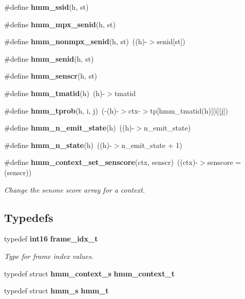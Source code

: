 \begin{DoxyCompactItemize}
\item 
\#define {\bfseries hmm\-\_\-ssid}(h, st)
\item 
\#define {\bfseries hmm\-\_\-mpx\-\_\-senid}(h, st)
\item 
\#define {\bfseries hmm\-\_\-nonmpx\-\_\-senid}(h, st)~((h)-\/$>$senid[st])\label{hmm_8h_a45850600910ae0839f34792b00b5970b}

\item 
\#define {\bfseries hmm\-\_\-senid}(h, st)
\item 
\#define {\bfseries hmm\-\_\-senscr}(h, st)
\item 
\#define {\bfseries hmm\-\_\-tmatid}(h)~(h)-\/$>$tmatid\label{hmm_8h_a749193daefb4247e56dbc6b3f2d75c14}

\item 
\#define {\bfseries hmm\-\_\-tprob}(h, i, j)~(-\/(h)-\/$>$ctx-\/$>$tp[hmm\-\_\-tmatid(h)][i][j])\label{hmm_8h_a3d6e71af2d2ce897e63a5ee8c5741593}

\item 
\#define {\bfseries hmm\-\_\-n\-\_\-emit\-\_\-state}(h)~((h)-\/$>$n\-\_\-emit\-\_\-state)\label{hmm_8h_a4ef324f17daafd4de126b88671c7e93c}

\item 
\#define {\bfseries hmm\-\_\-n\-\_\-state}(h)~((h)-\/$>$n\-\_\-emit\-\_\-state + 1)\label{hmm_8h_a16311c1d64310ad3a8af33eec0fbe9f1}

\item 
\#define {\bf hmm\-\_\-context\-\_\-set\-\_\-senscore}(ctx, senscr)~((ctx)-\/$>$senscore = (senscr))\label{hmm_8h_a44d0b5515cb269bf9b95f62aada18cbb}

\begin{DoxyCompactList}\small\item\em \-Change the senone score array for a context. \end{DoxyCompactList}\end{DoxyCompactItemize}
\subsection*{\-Typedefs}
\begin{DoxyCompactItemize}
\item 
typedef {\bf int16} {\bf frame\-\_\-idx\-\_\-t}
\begin{DoxyCompactList}\small\item\em \-Type for frame index values. \end{DoxyCompactList}\item 
typedef struct {\bf hmm\-\_\-context\-\_\-s} {\bfseries hmm\-\_\-context\-\_\-t}\label{hmm_8h_a87dd8e0478af63326664232541d2ade6}

\item 
typedef struct {\bf hmm\-\_\-s} {\bfseries hmm\-\_\-t}\label{hmm_8h_a6f69b65f5fd63aa882fbe6002be74c13}

\end{DoxyCompactItemize}
